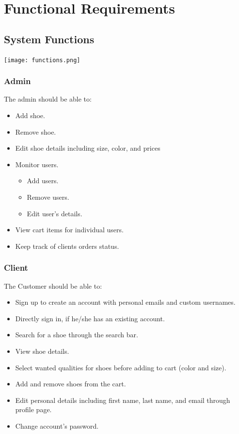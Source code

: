 \documentclass[12pt]{article}
\begin{document}
\pagebreak 
\section{Functional Requirements}
\subsection{System Functions}\label{System Functions}
\texttt{[image: functions.png]}
\subsubsection{Admin}
The admin should be able to:
\begin{itemize}
\item Add shoe.
\item Remove shoe.
\item Edit shoe details including size, color, and prices
\item Monitor users.
\begin{itemize}
    \item Add users.
    \item Remove users.
    \item Edit user's details.
\end{itemize}
\item View cart items for individual users.
\item Keep track of clients orders status.
\end{itemize}
\subsubsection{Client}
The Customer should be able to:
\begin{itemize}
\item Sign up to create an account with personal emails and custom usernames.
\item Directly sign in, if he/she has an existing account.
\item Search for a shoe through the search bar.
\item View shoe details.
\item Select wanted qualities for shoes before adding to cart (color and size).
\item Add and remove shoes from the cart.
\item Edit personal details including first name, last name, and email through profile page.
\item Change account's password.
\end{itemize}
\end{document}
